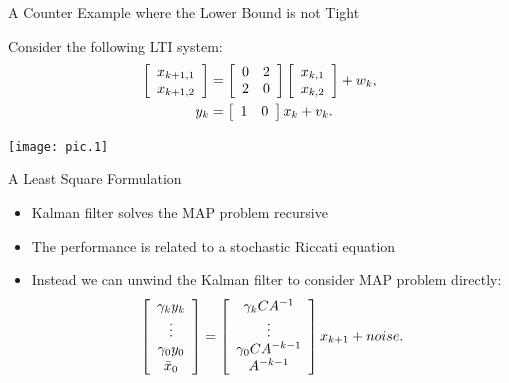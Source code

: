 \documentclass[10pt]{beamer}
\DeclareMathOperator{\1}{\textbf{1}}
\begin{document}
\begin{frame}{A Counter Example where the Lower Bound is not Tight}

  Consider the following LTI system:
  \begin{displaymath}
    \begin{split}
      \left[ {\begin{array}{*{20}c}
	    x_{k+1,1}  \\
	    x_{k+1,2}
      \end{array}} \right] &=
      \left[ {\begin{array}{*{20}c}
	    0 & 2  \\
	    2 & 0 
	    \end{array}} \right]  \left[ {\begin{array}{*{20}c}
	    x_{k,1}  \\
	    x_{k,2}
      \end{array}} \right] + w_k,\\
      y_k &= \left[ {\begin{array}{*{20}c}
	    1 & 0 
      \end{array}} \right] x_k + v_k.
	  \end{split}
	\end{displaymath}
	\begin{center}
	  \texttt{[image: pic.1]}
	\end{center}
      \end{frame}

      \begin{frame}{A Least Square Formulation}
	\begin{itemize}
	  \item  Kalman filter solves the MAP problem recursive
	  \item The performance is related to a stochastic Riccati equation
	  \item Instead we can unwind the Kalman filter to consider MAP problem directly:
	\begin{displaymath}
	  \left[ {\begin{array}{*{20}c}
		{\gamma_k y_k } \\
		\vdots \\                                                           {\gamma_0y_0 } \\
		\bar x_0 \\
		\end{array}} \right] = \left[ {\begin{array}{*{20}c}                  
		{\gamma_k CA^{ - 1} } \\
		\vdots \\
		{\gamma_{0}CA^{ - k-1} } \\
		{A^{ - k - 1} } \\
	  \end{array}} \right]x_{k + 1} + noise.
	\end{displaymath} 
	\end{itemize}
      \end{frame}
\end{document}
